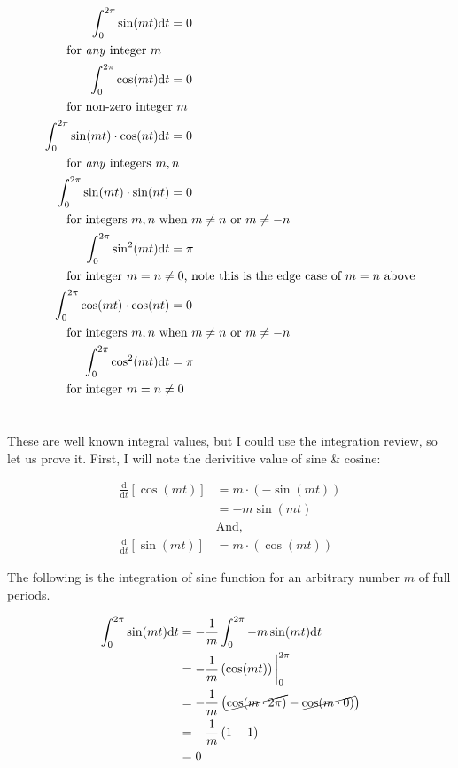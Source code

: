 \documentclass[10pt]{article} %
\begin{document}
\begin{align}
    \int_0^{2\pi} \sin(mt)\mathrm{d}t &= 0 \\
    \intertext{\hspace{0.5cm} for \textit{any} integer $m$}
    \int_0^{2\pi} \cos(mt)\mathrm{d}t &= 0 \\
    \intertext{\hspace{0.5cm} for non-zero integer $m$}
    \int_0^{2\pi} \sin(mt) \cdot \cos(nt)\mathrm{d}t &= 0 \\
    \intertext{\hspace{0.5cm} for \textit{any} integers $m, n$}
    \int_0^{2\pi} \sin(mt) \cdot \sin(nt) &= 0 \\
    \intertext{\hspace{0.5cm} for integers $m,n$ when $m \neq n$ or $m \neq -n$}
    \int_0^{2\pi} \sin^2(mt)\mathrm{d}t &= \pi \\
    \intertext{\hspace{0.5cm} for integer $m = n \neq 0$, note this is the edge case of $m=n$ above}
    \int_0^{2\pi} \cos(mt) \cdot \cos(nt) &= 0 \\
    \intertext{\hspace{0.5cm} for integers $m,n$ when $m \neq n$ or $m \neq -n$}
    \int_0^{2\pi} \cos^2(mt)\mathrm{d}t &= \pi \\
    \intertext{\hspace{0.5cm} for integer $m = n \neq 0$} \notag
\end{align}

These are well known integral values, but I could use the integration review, so let us prove it. First, I will note the derivitive value of sine \& cosine:

\begin{align*}
    \frac{\mathrm{d}}{\mathrm{d}t}[\cos(mt)] & = m\cdot\left(-\sin(mt)\right) \\
    & = -m\sin(mt)\\
    &\text{And,}\\
    \frac{\mathrm{d}}{\mathrm{d}t}[\sin(mt)] & = m\cdot\left(\cos(mt)\right)
\end{align*}

The following is the integration of sine function for an arbitrary number $m$ of full periods.

\begin{align*}
    \int_0^{2\pi} \sin(mt)\mathrm{d}t & = -\frac1m\int_0^{2\pi}-m\sin(mt)\mathrm{d}t \\
    & = -\frac1m\left(\cos(mt)\right)\bigg\rvert_0^{2\pi} \\
    & = -\frac1m\left(\cancel{\cos(m\cdot2\pi)} - \cancel{\cos(m\cdot 0)}\right) \\
    & = -\frac1m\left(1 - 1\right) \\
    & = 0
\end{align*}
\end{document}
